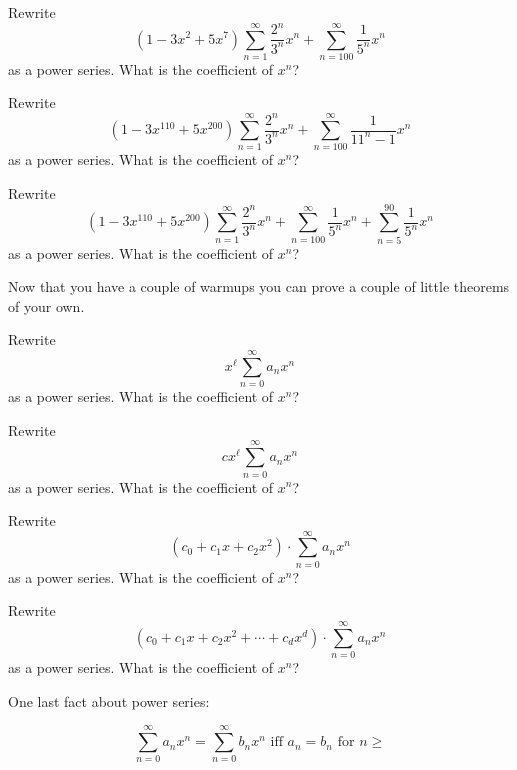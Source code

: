 \newpage

\newpage
\begin{ex}
Rewrite 
\[
(1 - 3x^2 + 5x^7) \sum_{n = 1}^\infty \frac{2^n}{3^n}x^n
+ \sum_{n=100}^\infty \frac{1}{5^n}x^n 
\]
as a
power series.
What is the coefficient of $x^n$?
\end{ex}

\newpage
\begin{ex}
Rewrite 
\[
(1 - 3x^{110} + 5x^{200}) \sum_{n = 1}^\infty \frac{2^n}{3^n}x^n
+ \sum_{n=100}^\infty \frac{1}{11^n - 1}x^n
\] as a
power series.
What is the coefficient of $x^n$?
\end{ex}

\newpage
\begin{ex}
Rewrite 
\[
(1 - 3x^{110} + 5x^{200}) \sum_{n = 1}^\infty \frac{2^n}{3^n}x^n
+ \sum_{n=100}^\infty \frac{1}{5^n}x^n
+ \sum_{n=5}^{90} \frac{1}{5^n}x^n 
\] as a
power series.
What is the coefficient of $x^n$?
\end{ex}

\newpage
Now that you have a couple of warmups you can prove
a couple of little theorems of your own.

\begin{ex}
Rewrite 
\[
x^\ell \sum_{n = 0}^\infty a_n x^n
\] 
as a
power series.
What is the coefficient of $x^n$?
\end{ex}

\newpage
\begin{ex}
Rewrite 
\[
cx^\ell \sum_{n = 0}^\infty a_n x^n
\] 
as a
power series.
What is the coefficient of $x^n$?
\end{ex}

\newpage
\begin{ex}
Rewrite 
\[
(c_0 + c_1x + c_2 x^2) \cdot \sum_{n = 0}^\infty a_n x^n
\] 
as a
power series.
What is the coefficient of $x^n$?
\end{ex}

\newpage
\begin{ex}
Rewrite 
\[
(c_0 + c_1x + c_2 x^2 + \cdots + c_d x^d) \cdot \sum_{n = 0}^\infty a_n x^n
\] 
as a
power series.
What is the coefficient of $x^n$?
\end{ex}


\newpage
One last fact about power series:

\[
\sum_{n = 0}^\infty a_nx^n =
\sum_{n = 0}^\infty b_nx^n
\text{ iff }
a_n = b_n \text{ for } n \geq 
\]
